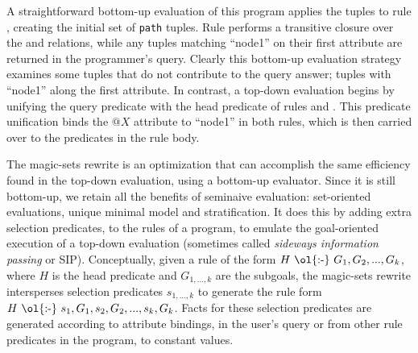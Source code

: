 A straightforward bottom-up evaluation of this program applies the 
tuples to rule , creating the initial set of {\tt path} tuples.  Rule
 performs a transitive closure over the  and 
relations, while any  tuples matching ``node1'' on their first
attribute are returned in the programmer's query.  Clearly this bottom-up
evaluation strategy examines some  tuples that do not contribute to
the query answer; tuples with ``node1'' along the first attribute.  In
contrast, a top-down evaluation begins by unifying the query predicate with the
head predicate of rules  and .  This  predicate
unification binds the $@X$ attribute to ``node1'' in both rules, which is then
carried over to the predicates in the rule body.  

The magic-sets rewrite is an optimization that can accomplish the same
efficiency found in the top-down evaluation, using a bottom-up evaluator.
Since it is still bottom-up, we retain all the benefits of seminaive
evaluation: set-oriented evaluations, unique minimal model and stratification.
It does this by adding extra selection predicates, to the rules of a program, to
emulate the goal-oriented execution of a top-down evaluation (sometimes called
\emph{sideways information passing} or SIP).  Conceptually, given a rule of the
form $H\ \text{\ol{:-}}\ G_1, G_2, ..., G_k$, where $H$ is the head predicate
and $G_{1,...,k}$ are the subgoals, the magic-sets rewrite intersperses
selection predicates $s_{1,...,k}$ to generate the rule form $H\
\text{\ol{:-}}\ s_1, G_1, s_2, G_2, ..., s_{k}, G_k$.  Facts for these
selection predicates are generated according to attribute bindings, in the
user's query or from other rule predicates in the program, to constant values.

